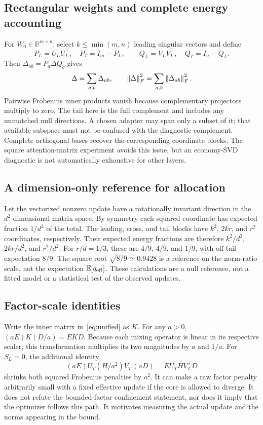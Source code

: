 \subsection{Rectangular weights and complete energy accounting}
\label{app:rectangular}
For $W_0\in\mathbb R^{m\times n}$, select $k\le\min(m,n)$ leading singular vectors and define
\begin{equation}
P_L=U_LU_L^\top,\quad P_T=I_m-P_L,\qquad
Q_L=V_LV_L^\top,\quad Q_T=I_n-Q_L.
\end{equation}
Then $\Delta_{ab}=P_a\Delta Q_b$ gives
\begin{equation}
\Delta=\sum_{a,b}\Delta_{ab},\qquad
\left\|\Delta\right\|_F^2=\sum_{a,b}\left\|\Delta_{ab}\right\|_F^2.
\end{equation}
Pairwise Frobenius inner products vanish because complementary projectors multiply to zero. The tail here is the full complement and includes any unmatched null directions. A chosen adapter may span only a subset of it; that available subspace must not be confused with the diagnostic complement. Complete orthogonal bases recover the corresponding coordinate blocks. The square attention-matrix experiment avoids this issue, but an economy-SVD diagnostic is not automatically exhaustive for other layers.

\subsection{A dimension-only reference for allocation}
\label{app:dimension}
Let the vectorized nonzero update have a rotationally invariant direction in the $d^2$-dimensional matrix space. By symmetry each squared coordinate has expected fraction $1/d^2$ of the total. The leading, cross, and tail blocks have $k^2$, $2kr$, and $r^2$ coordinates, respectively. Their expected energy fractions are therefore $k^2/d^2$, $2kr/d^2$, and $r^2/d^2$. For $r/d=1/3$, these are $4/9$, $4/9$, and $1/9$, with off-tail expectation $8/9$. The square root $\sqrt{8/9}\simeq0.9428$ is a reference on the norm-ratio scale, not the expectation $\mathbb E[q_{\mathrm{off}}]$. These calculations are a null reference, not a fitted model or a statistical test of the observed updates.

\subsection{Factor-scale identities}
Write the inner matrix in~\eqref{eq:unified} as $K$. For any $a>0$, $(aE)K(D/a)=EKD$. Because each mixing operator is linear in its respective scaler, this transformation multiplies its two magnitudes by $a$ and $1/a$. For $S_L=0$, the additional identity
\begin{equation}
(aE)U_T(H/a^2)V_T^\top(aD)=E U_T H V_T^\top D
\end{equation}
shrinks both squared Frobenius penalties by $a^2$. It can make a raw factor penalty arbitrarily small with a fixed effective update if the core is allowed to diverge. It does not refute the bounded-factor confinement statement, nor does it imply that the optimizer follows this path. It motivates measuring the actual update and the norms appearing in the bound.
